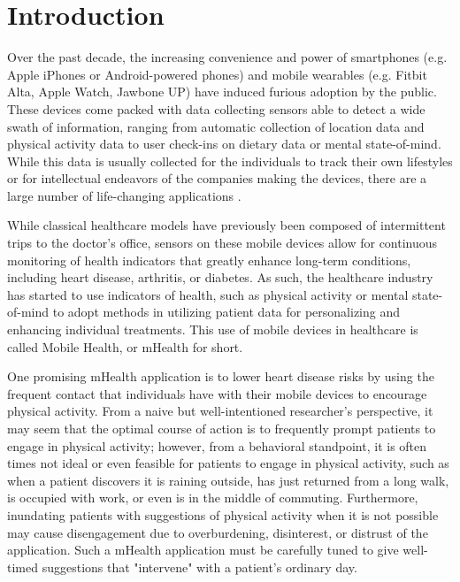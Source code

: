 \chapter{Introduction}
\label{introduction}

Over the past decade, the increasing convenience and power of smartphones (e.g. Apple iPhones or Android-powered phones) and mobile wearables (e.g. Fitbit Alta, Apple Watch, Jawbone UP) have induced furious adoption by the public.  These devices come packed with data collecting sensors able to detect a wide swath of information, ranging from automatic collection of location data and physical activity data to user check-ins on dietary data or mental state-of-mind.  While this data is usually collected for the individuals to track their own lifestyles or for intellectual endeavors of the companies making the devices, there are a large number of life-changing applications \citep{Ramkumar2017}.  

While classical healthcare models have previously been composed of intermittent trips to the doctor's office, sensors on these mobile devices allow for continuous monitoring of health indicators that greatly enhance long-term conditions, including heart disease, arthritis, or diabetes.  As such, the healthcare industry has started to use indicators of health, such as physical activity or mental state-of-mind to adopt methods in utilizing patient data for personalizing and enhancing individual treatments.  This use of mobile devices in healthcare is called Mobile Health, or mHealth for short.

One promising mHealth application is to lower heart disease risks by using the frequent contact that individuals have with their mobile devices to encourage physical activity.  From a naive but well-intentioned researcher's perspective, it may seem that the optimal course of action is to frequently prompt patients to engage in physical activity; however, from a behavioral standpoint, it is often times not ideal or even feasible for patients to engage in physical activity, such as when a patient discovers it is raining outside, has just returned from a long walk, is occupied with work, or even is in the middle of commuting.  Furthermore, inundating patients with suggestions of physical activity when it is not possible may cause disengagement due to overburdening, disinterest, or distrust of the application.  Such a mHealth application must be carefully tuned to give well-timed suggestions that "intervene" with a patient's ordinary day.  

